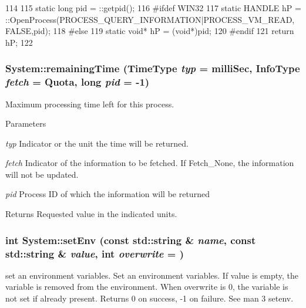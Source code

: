 \begin{DoxyCode}
114                               {
115   static long pid = ::getpid();
116 #ifdef WIN32
117   static HANDLE hP = ::OpenProcess(PROCESS_QUERY_INFORMATION|PROCESS_VM_READ,
      FALSE,pid);
118 #else
119   static void* hP = (void*)pid;
120 #endif
121   return hP;
122 }
\end{DoxyCode}
\hypertarget{namespaceSystem_a5c0293a51a0a32d5ea7907b9749a977f}{
\subsubsection[{remainingTime}]{ System::remainingTime (TimeType {\em typ} = {\ttfamily milliSec}, \/  InfoType {\em fetch} = {\ttfamily Quota}, \/  long {\em pid} = {\ttfamily -\/1})}}
\label{namespaceSystem_a5c0293a51a0a32d5ea7907b9749a977f}
Maximum processing time left for this process. 
\begin{DoxyParams}{Parameters}
\item[{\em typ}]Indicator or the unit the time will be returned. \item[{\em fetch}]Indicator of the information to be fetched. If Fetch\_\-None, the information will not be updated. \item[{\em pid}]Process ID of which the information will be returned \end{DoxyParams}
\begin{DoxyReturn}{Returns}
Requested value in the indicated units. 
\end{DoxyReturn}
\hypertarget{namespaceSystem_acbc43cfe7bf59f05d1723317cc9c0098}{
\subsubsection[{setEnv}]{\setlength{\rightskip}{0pt plus 5cm}int System::setEnv (const std::string \& {\em name}, \/  const std::string \& {\em value}, \/  int {\em overwrite} = {})}}
\label{namespaceSystem_acbc43cfe7bf59f05d1723317cc9c0098}


set an environment variables. Set an environment variables. If value is empty, the variable is removed from the environment. When overwrite is 0, the variable is not set if already present. Returns 0 on success, -\/1 on failure. See man 3 setenv.

